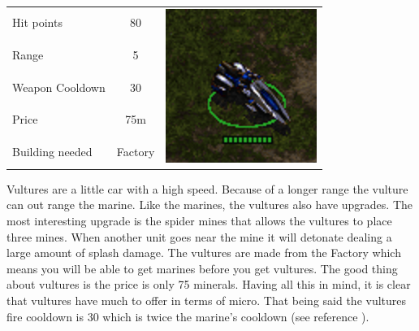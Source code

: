 \begin{table}[H]
	\begin{tabular}{| l | c | c}
		\cline{1-2}
		Hit points		& 80		&\multirow{5}{*}{\includegraphics[scale=.4]
									{Figures/Units/vulture.png}}	\\ \cline{1-2}
		Range			& 5 		&\\ \cline{1-2}
		Weapon Cooldown	& 30 		&\\ \cline{1-2}
		Price			& 75m		&\\ \cline{1-2}
		Building needed	& Factory	&\\ \cline{1-2}
	\end{tabular}
\end{table}

Vultures are a little car with a high speed. Because of a longer range the vulture can out range the marine. Like the marines, the
vultures also have upgrades. The most interesting upgrade is the spider mines that allows the vultures to place three mines. When another unit goes near the mine it will detonate dealing a large amount of splash damage. The vultures are made
from the Factory which means you will be able to get marines before you get vultures. The good thing about vultures is the price is only 75 minerals. Having all this in mind, it is clear that vultures have much to offer in terms of micro.
That being said the vultures fire cooldown is 30 which is twice the marine's cooldown (see reference \cite{wiki_vulture}).

